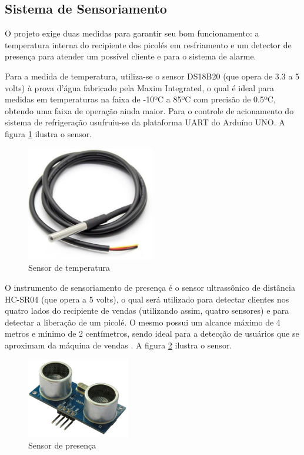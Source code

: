 \subsection{Sistema de Sensoriamento}

O projeto exige duas medidas para garantir seu bom funcionamento: a temperatura interna do recipiente dos picolés em resfriamento e um detector de presença para atender um possível cliente e para o sistema de alarme. 

	Para a medida de temperatura, utiliza-se o sensor DS18B20 (que opera de 3.3 a 5 volts) à prova d'água fabricado pela Maxim Integrated, o qual é ideal para medidas em temperaturas na faixa de -10ºC a 85ºC com precisão de 0.5ºC, obtendo uma faixa de operação ainda maior. Para o controle de acionamento do sistema de refrigeração usufruiu-se da plataforma UART do Arduíno UNO. A figura \ref{fig:sensor_temperatura} ilustra o sensor.
    
\begin{figure}[H]
	\centering
    \includegraphics[width=0.5\textwidth]{figuras/sensor_temperatura}
    \caption{Sensor de temperatura}
    \label{fig:sensor_temperatura}
\end{figure}

O instrumento de sensoriamento de presença é o sensor ultrassônico de distância HC-SR04 (que opera a 5 volts), o qual será utilizado para detectar clientes nos quatro lados do recipiente de vendas (utilizando assim, quatro sensores) e para detectar a liberação de um picolé. O mesmo possui um alcance máximo de 4 metros e mínimo de 2 centímetros, sendo ideal para a detecção de usuários que se aproximam da máquina de vendas \cite{mq3}. A figura \ref{fig:sensor_presenca} ilustra o sensor.

\begin{figure}[H]
	\centering
    \includegraphics[width=0.4\textwidth]{figuras/sensor_presenca}
    \caption{Sensor de presença}
    \label{fig:sensor_presenca}
\end{figure}

